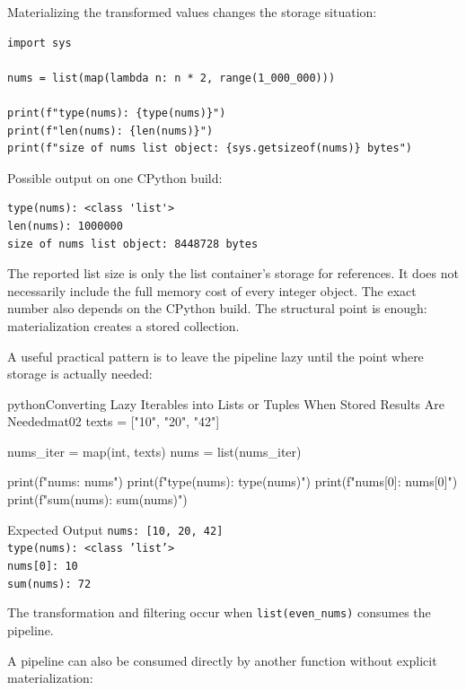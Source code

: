 \documentclass[a4paper,twoside]{report}
\begin{document}
Materializing the transformed values changes the storage situation:

\begin{verbatim}
import sys

nums = list(map(lambda n: n * 2, range(1_000_000)))

print(f"type(nums): {type(nums)}")
print(f"len(nums): {len(nums)}")
print(f"size of nums list object: {sys.getsizeof(nums)} bytes")
\end{verbatim}

Possible output on one CPython build:

\begin{verbatim}
type(nums): <class 'list'>
len(nums): 1000000
size of nums list object: 8448728 bytes
\end{verbatim}

The reported list size is only the list container's storage for references. It does not necessarily include the full memory cost of every integer object. The exact number also depends on the CPython build. The structural point is enough: materialization creates a stored collection.

A useful practical pattern is to leave the pipeline lazy until the point where storage is actually needed:

\begin{codebox}[]{python}{Converting Lazy Iterables into Lists or Tuples When Stored Results Are Needed}{mat02}
texts = ["10", "20", "42"]

nums_iter = map(int, texts)
nums = list(nums_iter)

print(f"nums: {nums}")
print(f"type(nums): {type(nums)}")
print(f"nums[0]: {nums[0]}")
print(f"sum(nums): {sum(nums)}")
\end{codebox}


\begin{iobox}{Expected Output}
\texttt{nums: [10, 20, 42]} \\
\texttt{type(nums): <class 'list'>} \\
\texttt{nums[0]: 10} \\
\texttt{sum(nums): 72} \\
\end{iobox}




The transformation and filtering occur when \texttt{list(even\_nums)} consumes the pipeline.

A pipeline can also be consumed directly by another function without explicit materialization:
\end{document}
